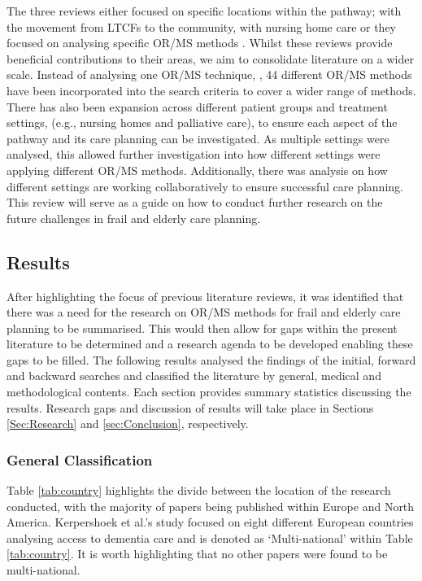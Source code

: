 \documentclass[../thesis.tex]{subfiles}
\begin{document}
The three reviews either focused on specific locations within the pathway; \cite{Freeman} with the movement from LTCFs to the community, \cite{Gaugler} with nursing home care or they focused on analysing specific OR/MS methods \cite{Berntsen}. Whilst these reviews provide beneficial contributions to their areas, we aim to consolidate literature on a wider scale. Instead of analysing one OR/MS technique, \cite{Berntsen}, 44 different OR/MS methods have been incorporated into the search criteria to cover a wider range of methods. There has also been expansion across different patient groups and treatment settings, (e.g., nursing homes and palliative care), to ensure each aspect of the pathway and its care planning can be investigated. As multiple settings were analysed, this allowed further investigation into how different settings were applying different OR/MS methods. Additionally, there was analysis on how different settings are working collaboratively to ensure successful care planning. This review will serve as a guide on how to conduct further research on the future challenges in frail and elderly care planning.  

\subsection{Results} \label{sec:Classification} 
After highlighting the focus of previous literature reviews, it was identified that there was a need for the research on OR/MS methods for frail and elderly care planning to be summarised. This would then allow for gaps within the present literature to be determined and a research agenda to be developed enabling these gaps to be filled. The following results analysed the findings of the initial, forward and backward searches and classified the literature by general, medical and methodological contents. Each section provides summary statistics discussing the results. Research gaps and discussion of results will take place in Sections \ref{Sec:Research} and \ref{sec:Conclusion}, respectively.

\subsubsection{General Classification}
Table \ref{tab:country} highlights the divide between the location of the research conducted, with the majority of papers being published within Europe and North America. Kerpershoek et al.'s \cite{Kerpershoek} study focused on eight different European countries analysing access to dementia care and is denoted as `Multi-national' within Table \ref{tab:country}. It is worth highlighting that no other papers were found to be multi-national.
\end{document}
